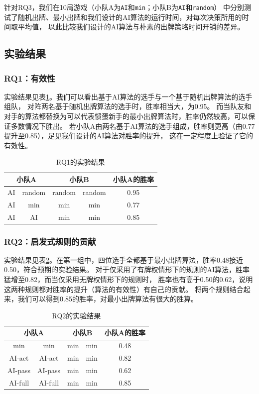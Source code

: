 \documentclass[a4paper]{ctexart}
\begin{document}
针对RQ3，我们在10局游戏（小队A为\texttt{AI}和\texttt{min}；小队B为\texttt{AI}和\texttt{random}）
中分别测试了随机出牌、最小出牌和我们设计的AI算法的运行时间，对每次决策所用的时间取平均值，
以此比较我们设计的AI算法与朴素的出牌策略时间开销的差异。

\subsection{实验结果}

\subsubsection{RQ1：有效性}

实验结果见表\ref{RQ1_result}。我们可以看出基于AI算法的选手与一个基于随机出牌算法的选手组队，
对阵两名基于随机出牌算法的选手时，胜率相当大，为0.95。
而当队友和对手的算法都替换为可以代表惯蛋新手的最小出牌算法时，胜率仍然较高，可以保证多数情况下胜出。
若小队A由两名基于AI算法的选手组成，胜率则更高（由0.77提升至0.85），足见我们设计的AI算法对胜率的提升，
这在一定程度上验证了它的有效性。

\begin{table}
	\centering 
	\caption{RQ1的实验结果}
	\label{RQ1_result}
	\begin{tabular}{|c|c|c|c|c|}
		\hline
		\multicolumn{2}{|c|}{小队A} & \multicolumn{2}{c|}{小队B} & 小队A的胜率\\ \hline
		AI & random & random & random & 0.95 \\ \hline
		AI & min & min & min & 0.77 \\ \hline
		AI & AI & min & min & 0.85 \\ \hline
	\end{tabular}
\end{table}

\subsubsection{RQ2：启发式规则的贡献}

实验结果见表\ref{RQ2_result}。在第一组中，四位选手全都基于最小出牌算法，胜率0.48接近0.50，符合预期的实验结果。
对于仅采用了有牌权情形下的规则的AI算法，胜率猛增至0.82，而当仅采用无牌权情形下的规则时，
胜率也有高于0.50的0.62，说明这两种规则都对胜率的提升（算法的有效性）有自己的贡献。
将两个规则结合起来，我们可以得到0.85的胜率，对最小出牌算法有很大的胜算。

\begin{table}
	\centering 
	\caption{RQ2的实验结果}
	\label{RQ2_result}
	\begin{tabular}{|c|c|c|c|c|}
		\hline
		\multicolumn{2}{|c|}{小队A} & \multicolumn{2}{c|}{小队B} & 小队A的胜率 \\ \hline
		min & min & min & min & 0.48 \\ \hline
		AI-act  & AI-act & min & min & 0.82 \\ \hline
		AI-pass & AI-pass & min & min & 0.62 \\ \hline
		AI-full & AI-full & min & min & 0.85 \\ \hline
	\end{tabular}
\end{table}
\end{document}
